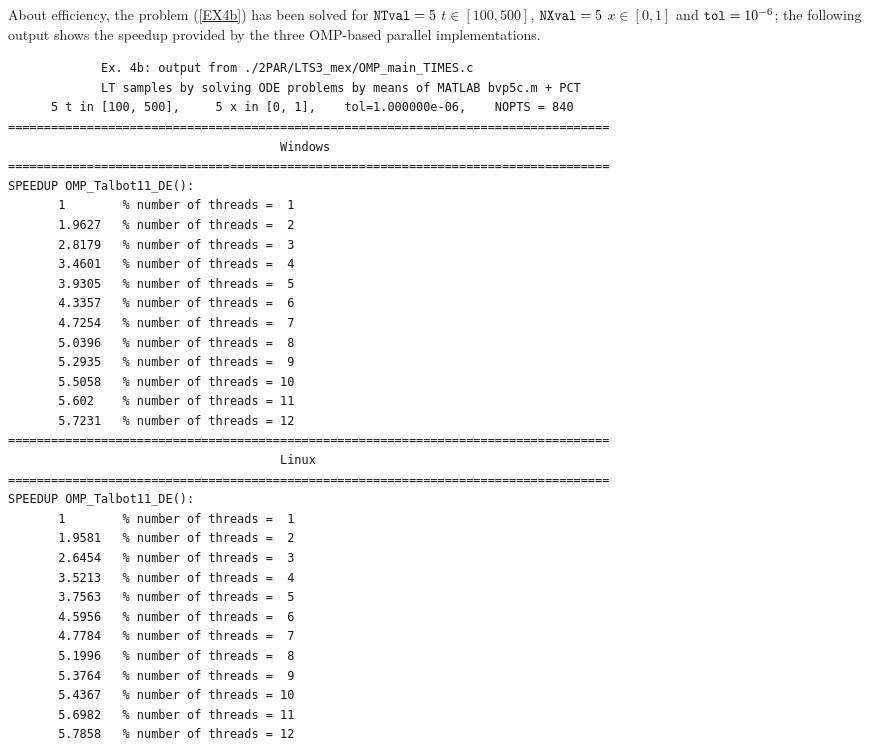 \documentclass[a4paper,10pt]{report}%
\begin{document}
About efficiency, the problem (\ref{EX4b}) has been solved for ${\tt NTval}=5$ $t\in[100, 500]$,
${\tt NXval}=5$ $x\in[0,1]$ and ${\tt tol}=10^{-6}$; the following output shows the speedup provided by the three
OMP-based parallel implementations.
\begin{lstlisting}
             Ex. 4b: output from ./2PAR/LTS3_mex/OMP_main_TIMES.c
             LT samples by solving ODE problems by means of MATLAB bvp5c.m + PCT
      5 t in [100, 500],     5 x in [0, 1],    tol=1.000000e-06,    NOPTS = 840
====================================================================================
                                      Windows
====================================================================================
SPEEDUP OMP_Talbot11_DE():
       1        % number of threads =  1
       1.9627   % number of threads =  2
       2.8179   % number of threads =  3
       3.4601   % number of threads =  4
       3.9305   % number of threads =  5
       4.3357   % number of threads =  6
       4.7254   % number of threads =  7
       5.0396   % number of threads =  8
       5.2935   % number of threads =  9
       5.5058   % number of threads = 10
       5.602    % number of threads = 11
       5.7231   % number of threads = 12
====================================================================================
                                      Linux
====================================================================================
SPEEDUP OMP_Talbot11_DE():
       1        % number of threads =  1
       1.9581   % number of threads =  2
       2.6454   % number of threads =  3
       3.5213   % number of threads =  4
       3.7563   % number of threads =  5
       4.5956   % number of threads =  6
       4.7784   % number of threads =  7
       5.1996   % number of threads =  8
       5.3764   % number of threads =  9
       5.4367   % number of threads = 10
       5.6982   % number of threads = 11
       5.7858   % number of threads = 12


\end{lstlisting}
\end{document}
